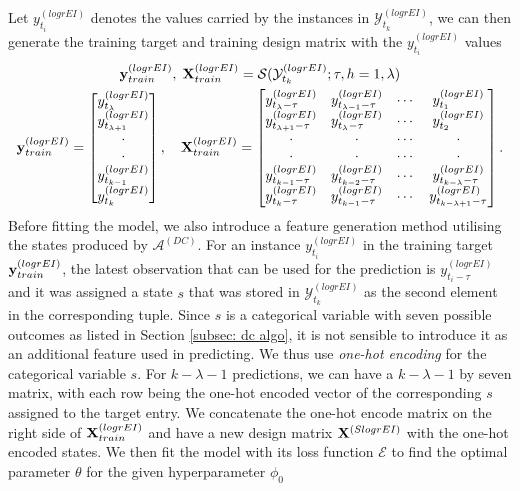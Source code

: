 Let $y^{(logrEI)}_{t_i}$ denotes the values carried by the instances in $\mathcal{Y}^{(logrEI)}_{t_k}$, we can then generate the training target and training design matrix with the $y^{(logrEI)}_{t_i}$ values
\begin{gather*}
    \mathbf{y}^{(logrEI)}_{train}, \; \mathbf{X}^{(logrEI)}_{train} = \mathcal{S} (\mathcal{Y}^{(logrEI)}_{t_k} ; \tau, h=1, \lambda) \\
    \mathbf{y}^{(logrEI)}_{train} = \begin{bmatrix}
        y^{(logrEI)}_{t_\lambda}       \\
        y^{(logrEI)}_{t_{\lambda + 1}} \\
        \cdot               \\
        \cdot               \\
        y^{(logrEI)}_{t_{k-1}}         \\
        y^{(logrEI)}_{t_k}             \\
    \end{bmatrix}
    , \quad
    \mathbf{X}^{(logrEI)}_{train} = \begin{bmatrix}
        y^{(logrEI)}_{t_{\lambda} - \tau}   & y^{(logrEI)}_{t_{\lambda-1} - \tau} & \cdots & y^{(logrEI)}_{t_{1}} \\
        y^{(logrEI)}_{t_{\lambda+1} - \tau} & y^{(logrEI)}_{t_{\lambda} - \tau}   & \cdots & y^{(logrEI)}_{t_{2}} \\
        \cdot                    & \cdot                    & \cdots & \cdot     \\
        \cdot                    & \cdot                    & \cdots & \cdot     \\
        y^{(logrEI)}_{t_{k-1} - \tau}       & y^{(logrEI)}_{t_{k-2} - \tau}       & \cdots & y^{(logrEI)}_{t_{k - \lambda} - \tau}     \\
        y^{(logrEI)}_{t_{k} - \tau}         & y^{(logrEI)}_{t_{k-1} - \tau}       & \cdots & y^{(logrEI)}_{t_{k - \lambda + 1} - \tau} \\
    \end{bmatrix}.
\end{gather*}
Before fitting the model, we also introduce a feature generation method utilising the states produced by $\mathcal{A}^{(DC)}$. For an instance $y^{(logrEI)}_{t_i}$ in the training target $\mathbf{y}^{(logrEI)}_{train}$, the latest observation that can be used for the prediction is $y^{(logrEI)}_{t_i - \tau}$ and it was assigned a state $s$ that was stored in $\mathcal{Y}^{(logrEI)}_{t_k}$ as the second element in the corresponding tuple. Since $s$ is a categorical variable with seven possible outcomes as listed in Section \ref{subsec: dc algo}, it is not sensible to introduce it as an additional feature used in predicting. We thus use \textit{one-hot encoding} for the categorical variable $s$. For $k - \lambda - 1$ predictions, we can have a $k - \lambda - 1$ by seven matrix, with each row being the one-hot encoded vector of the corresponding $s$ assigned to the target entry. We concatenate the one-hot encode matrix on the right side of $\mathbf{X}^{(logrEI)}_{train}$ and have a new design matrix $\mathbf{X}^{(SlogrEI)}$ with the one-hot encoded states. We then fit the model with its loss function $\mathcal{E}$ to find the optimal parameter $\theta$ for the given hyperparameter $\phi_0$
